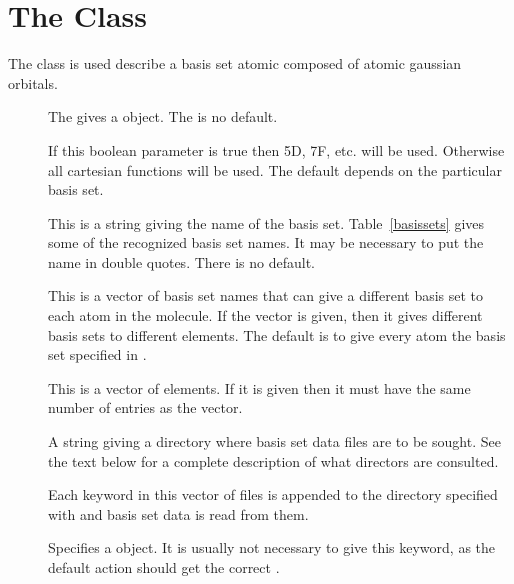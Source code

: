 

\section{The  Class}
\label{GaussianBasisSet}

The  class is used describe a
basis set atomic composed of atomic gaussian orbitals.

\begin{description}
  \item[] The gives a  object.
     The is no default.

  \item[] If this boolean parameter is true then
     5D, 7F, etc. will be used.  Otherwise all cartesian functions
     will be used.  The default depends on the particular basis set.

  \item[] This is a string giving the name of the basis set.
     Table~\ref{basissets} gives some of the recognized basis set names.
     It may be necessary to put the name in double quotes. There is no
     default.

  \item[] This is a vector of basis set names that can give a
     different basis set to each atom in the molecule.  If the
      vector is given, then it gives different basis sets
     to different elements.  The default is to give every atom the
     basis set specified in .

  \item[] This is a vector of elements.  If it is given
     then it must have the same number of entries as the 
     vector.

  \item[] A string giving a directory where basis
     set data files are to be sought.  See the text below for a
     complete description of what directors are consulted.

  \item[] Each keyword in this vector of files is
     appended to the directory specified with  and basis
     set data is read from them.

  \item[] Specifies a  object.
     It is usually not necessary to give this keyword, as the default
     action should get the correct .

\end{description}

